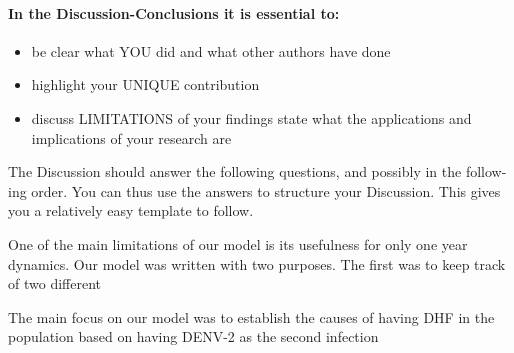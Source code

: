 \paragraph{In the Discussion-Conclusions it is essential to:}

\begin{itemize}
    \item
        be clear what YOU did and what other authors have done
    \item
        highlight your UNIQUE contribution
    
    \item
        discuss LIMITATIONS of your findings state what the
         applications and implications of your research are
\end{itemize}

The Discussion should answer the following questions, and possibly in the follow-
ing order. You can thus use the answers to structure your Discussion. This gives you
a relatively easy template to follow.


\noindent One of the main limitations of our model is its usefulness for only one year dynamics. 
Our model was written with two purposes. The first was to keep track of two different 

The main focus on our model was to establish the causes of having DHF in the population based on
having DENV-2 as the second infection 


